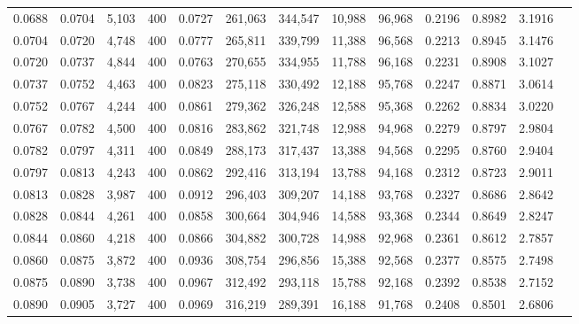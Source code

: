 \begin{tabular}{rrrrrrrrrrrrr}
0.0688 & 0.0704 &  5,103 &   400 &                                     0.0727 & 261,063 & 344,547 &  10,988 &  96,968 & 0.2196 & 0.8982 & 3.1916 \\
0.0704 & 0.0720 &  4,748 &   400 &                                     0.0777 & 265,811 & 339,799 &  11,388 &  96,568 & 0.2213 & 0.8945 & 3.1476 \\
0.0720 & 0.0737 &  4,844 &   400 &                                     0.0763 & 270,655 & 334,955 &  11,788 &  96,168 & 0.2231 & 0.8908 & 3.1027 \\
0.0737 & 0.0752 &  4,463 &   400 &                                     0.0823 & 275,118 & 330,492 &  12,188 &  95,768 & 0.2247 & 0.8871 & 3.0614 \\
0.0752 & 0.0767 &  4,244 &   400 &                                     0.0861 & 279,362 & 326,248 &  12,588 &  95,368 & 0.2262 & 0.8834 & 3.0220 \\
0.0767 & 0.0782 &  4,500 &   400 &                                     0.0816 & 283,862 & 321,748 &  12,988 &  94,968 & 0.2279 & 0.8797 & 2.9804 \\
0.0782 & 0.0797 &  4,311 &   400 &                                     0.0849 & 288,173 & 317,437 &  13,388 &  94,568 & 0.2295 & 0.8760 & 2.9404 \\
0.0797 & 0.0813 &  4,243 &   400 &                                     0.0862 & 292,416 & 313,194 &  13,788 &  94,168 & 0.2312 & 0.8723 & 2.9011 \\
0.0813 & 0.0828 &  3,987 &   400 &                                     0.0912 & 296,403 & 309,207 &  14,188 &  93,768 & 0.2327 & 0.8686 & 2.8642 \\
0.0828 & 0.0844 &  4,261 &   400 &                                     0.0858 & 300,664 & 304,946 &  14,588 &  93,368 & 0.2344 & 0.8649 & 2.8247 \\
0.0844 & 0.0860 &  4,218 &   400 &                                     0.0866 & 304,882 & 300,728 &  14,988 &  92,968 & 0.2361 & 0.8612 & 2.7857 \\
0.0860 & 0.0875 &  3,872 &   400 &                                     0.0936 & 308,754 & 296,856 &  15,388 &  92,568 & 0.2377 & 0.8575 & 2.7498 \\
0.0875 & 0.0890 &  3,738 &   400 &                                     0.0967 & 312,492 & 293,118 &  15,788 &  92,168 & 0.2392 & 0.8538 & 2.7152 \\
0.0890 & 0.0905 &  3,727 &   400 &                                     0.0969 & 316,219 & 289,391 &  16,188 &  91,768 & 0.2408 & 0.8501 & 2.6806 \\

\end{tabular}
